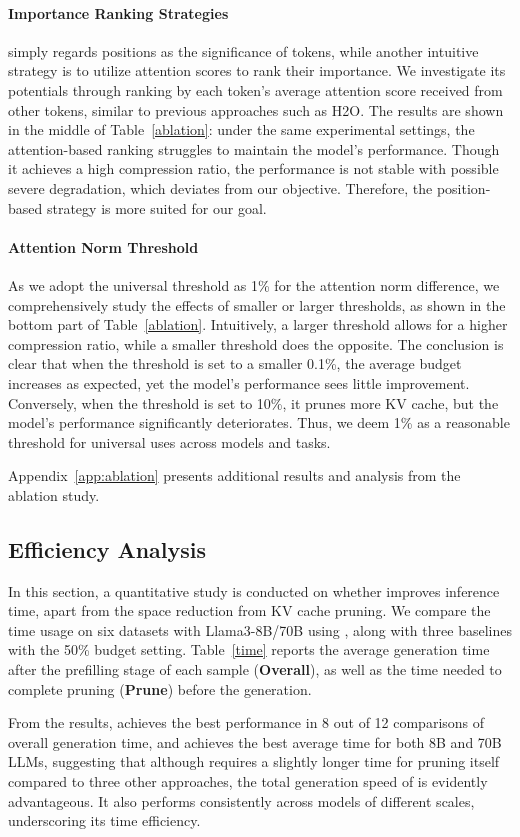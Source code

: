 \paragraph{Importance Ranking Strategies}
\method simply regards positions as the significance of tokens, while another intuitive strategy is to utilize attention scores to rank their importance. We investigate its potentials through ranking by each token's average attention score received from other tokens, similar to previous approaches such as H2O. The results are shown in the middle of Table~\ref{ablation}: under the same experimental settings, the attention-based ranking struggles to maintain the model's performance. Though it achieves a high compression ratio, the performance is not stable with possible severe degradation, which deviates from our objective. Therefore, the position-based strategy is more suited for our goal.

\paragraph{Attention Norm Threshold} As we adopt the universal threshold as 1\% for the attention norm difference, we comprehensively study the effects of smaller or larger thresholds, as shown in the bottom part of Table~\ref{ablation}. Intuitively, a larger threshold allows for a higher compression ratio, while a smaller threshold does the opposite. The conclusion is clear that when the threshold is set to a smaller 0.1\%, the average budget increases as expected, yet the model's performance sees little improvement. Conversely, when the threshold is set to 10\%, it prunes more KV cache, but the model's performance significantly deteriorates. Thus, we deem 1\% as a reasonable threshold for universal uses across models and tasks.

Appendix~\ref{app:ablation} presents additional results and analysis from the ablation study.

\subsection{Efficiency Analysis}
\label{ssec:time}

In this section, a quantitative study is conducted on whether \method improves inference time, apart from the space reduction from KV cache pruning. We compare the time usage on six datasets with Llama3-8B/70B using \method, along with three baselines with the 50\% budget setting. Table~\ref{time} reports the average generation time after the prefilling stage of each sample (\textbf{Overall}), as well as the time needed to complete pruning (\textbf{Prune}) before the generation. 

From the results, \method achieves the best performance in 8 out of 12 comparisons of overall generation time, and achieves the best average time for both 8B and 70B LLMs, suggesting that although \method requires a slightly longer time for pruning itself compared to three other approaches, the total generation speed of \method is evidently advantageous.
It also performs consistently across models of different scales, underscoring its time efficiency.